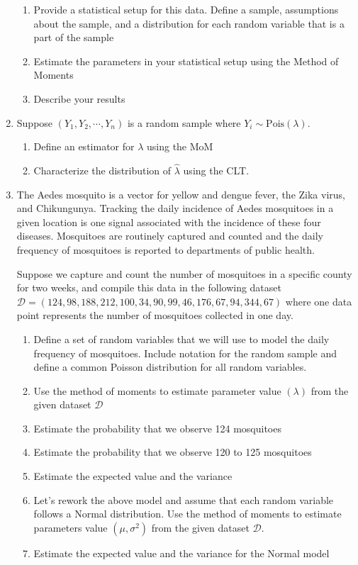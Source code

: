 \begin{enumerate}
    \begin{enumerate}
        \item Provide a statistical setup for this data. Define a sample, assumptions about the sample, and a distribution for each random variable that is a part of the sample
        \item Estimate the parameters in your statistical setup using the Method of Moments
        \item Describe your results
    \end{enumerate}
    
    \item Suppose $(Y_{1},Y_{2},\cdots,Y_{n})$ is a random sample where $Y_{i} \sim \text{Pois}(\lambda)$.
    \begin{enumerate}
        \item Define an estimator for $\lambda$ using the MoM
        \item Characterize the distribution of $\hat{\lambda}$ using the CLT.
    \end{enumerate}
    
    \item The Aedes mosquito is a vector for yellow and dengue fever, the Zika virus, and Chikungunya. Tracking the daily incidence of Aedes mosquitoes in a given location is one signal associated with the incidence of these four diseases. Mosquitoes are routinely captured and counted and the daily frequency of mosquitoes is reported to departments of public health.
    
    Suppose we capture and count the number of mosquitoes in a specific county for two weeks, and compile this data in the following dataset $\mathcal{D} = (124,98,188,212,100,34,90,99,46,176,67,94,344,67)$ where one data point represents the number of mosquitoes collected in one day.
    
    \begin{enumerate}
        \item Define a set of random variables that we will use to model the daily frequency of mosquitoes. Include notation for the random sample and define a common Poisson distribution for all random variables.
        \item Use the method of moments to estimate parameter value $(\lambda)$ from the given dataset $\mathcal{D}$
        \item Estimate the probability that we observe 124 mosquitoes
        \item Estimate the probability that we observe 120 to 125 mosquitoes
        \item Estimate the expected value and the variance
        \item Let's rework the above model and assume that each random variable follows a Normal distribution. Use the method of moments to estimate parameters value $(\mu, \sigma^{2})$ from the given dataset $\mathcal{D}$.
        \item Estimate the expected value and the variance for the Normal model
    \end{enumerate}
    

\end{enumerate}
